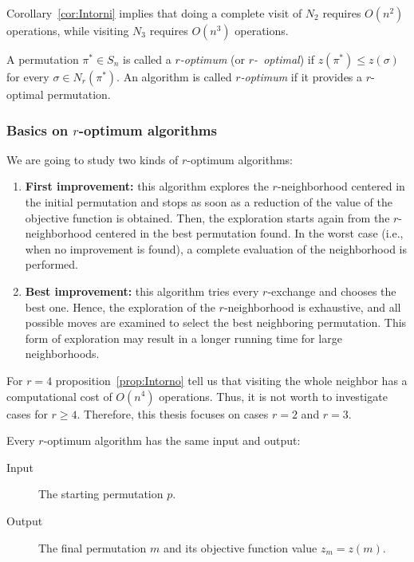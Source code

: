Corollary~\ref{cor:Intorni} implies that doing a complete visit of $N_2$ requires $O(n^2)$ operations, while visiting $N_3$ requires $O(n^3)$ operations.

\begin{defi}
	A permutation $\pi^* \in S_n$ is called a \textit{$r$-optimum} (or \textit{$r$-~optimal}) if $z(\pi^*) \le z(\sigma)$ for every $\sigma \in N_r(\pi^*)$.
	An algorithm is called \textit{$r$-optimum} if it provides a $r$-optimal permutation.
\end{defi}


\subsubsection{Basics on $r$-optimum algorithms}

\noindent We are going to study two kinds of $r$-optimum algorithms:
\begin{enumerate}

	\item \textbf{First improvement:}  	this algorithm explores the $r$-neighborhood centered in the initial permutation and stops as soon as a reduction of the value of the objective function is obtained. Then, the exploration starts again from the $r$-neighborhood centered in the best permutation found. In the worst case (i.e., when no improvement is found), a complete evaluation	of the neighborhood is performed.
		\item \textbf{Best improvement:} this algorithm tries every $r$-exchange and chooses the best one. Hence, the exploration of the $r$-neighborhood is exhaustive, and all possible moves are examined to select the best neighboring permutation. This form of exploration may  result in a longer running time for large neighborhoods.
\end{enumerate}








\noindent For $r=4$ proposition~\eqref{prop:Intorno} tell us that visiting the whole neighbor has a computational cost of $O(n^4)$ operations. Thus, it is not worth to investigate cases for $r\ge 4$. Therefore, this thesis focuses on cases $r=2$ and $r=3$.



Every $r$-optimum algorithm has the same input and output:
\begin{description}
	\item[Input] The starting permutation $p$.
	\item[Output] 
	 The final permutation $m$ and its objective function value $z_m=z(m)$.
\end{description}



